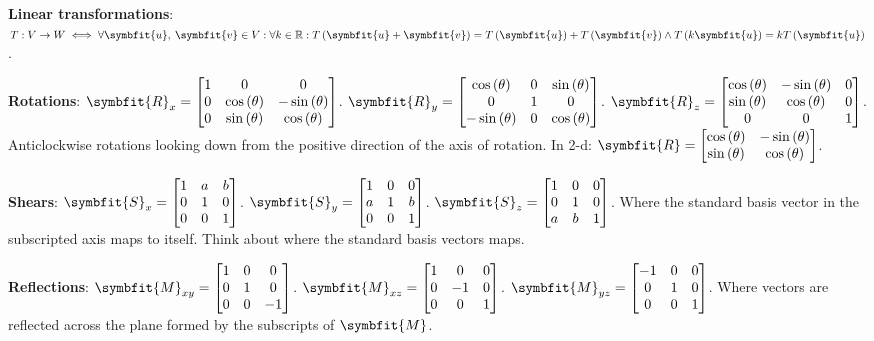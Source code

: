 \documentclass{article}
\begin{document}
\noindent \textbf{Linear transformations}: 
$T:V\rightarrow W \iff \forall \symbfit{u},\: \symbfit{v} \in V:\forall k \in \mathbb{R}:T\left(\symbfit{u}+\symbfit{v}\right) = T\left(\symbfit{u}\right) + T\left(\symbfit{v}\right) \wedge T\left(k\symbfit{u}\right) = kT\left(\symbfit{u}\right)$. 

\noindent \textbf{Rotations}: 
$\symbfit{R}_x = \mqty[1 & 0 & 0 \\ 0 & \cos{\left( \theta \right)} & -\sin{\left( \theta \right)} \\ 0 & \sin{\left( \theta \right)} & \cos{\left( \theta \right)}]$. 
$\symbfit{R}_y = \mqty[\cos{\left( \theta \right)} & 0 & \sin{\left( \theta \right)} \\ 0 & 1 & 0 \\ -\sin{\left( \theta \right)} & 0 & \cos{\left( \theta \right)}]$. 
$\symbfit{R}_z = \mqty[\cos{\left( \theta \right)} & -\sin{\left( \theta \right)} & 0 \\ \sin{\left( \theta \right)} & \cos{\left( \theta \right)} & 0 \\ 0 & 0 & 1]$. 
Anticlockwise rotations looking down from the positive direction of the 
axis of rotation.
In 2-d: 
$\symbfit{R} = \mqty[\cos{\left( \theta \right)} & -\sin{\left( \theta \right)} \\ \sin{\left( \theta \right)} & \cos{\left( \theta \right)}]$.
		
\noindent \textbf{Shears}: 
$\symbfit{S}_x = \mqty[1 & a & b \\ 0 & 1 & 0 \\ 0 & 0 & 1]$. 
$\symbfit{S}_y=\mqty[1 & 0 & 0 \\ a & 1 & b \\ 0 & 0 & 1]$. 
$\symbfit{S}_z=\mqty[1 & 0 & 0 \\ 0 & 1 & 0 \\ a & b & 1]$. 
Where the standard basis vector in the subscripted axis maps to itself. 
Think about where the standard basis vectors maps.

\noindent \textbf{Reflections}: 
$\symbfit{M}_{xy}=\mqty[1 & 0 & 0 \\ 0 & 1 & 0 \\ 0 & 0 & -1]$. 
$\symbfit{M}_{xz}=\mqty[1 & 0 & 0 \\ 0 & -1 & 0 \\ 0 & 0 & 1]$. 
$\symbfit{M}_{yz}=\mqty[-1 & 0 & 0 \\ 0 & 1 & 0 \\ 0 & 0 & 1]$. 
Where vectors are reflected across the plane formed by the subscripts of 
$\symbfit{M}$.
\end{document}
